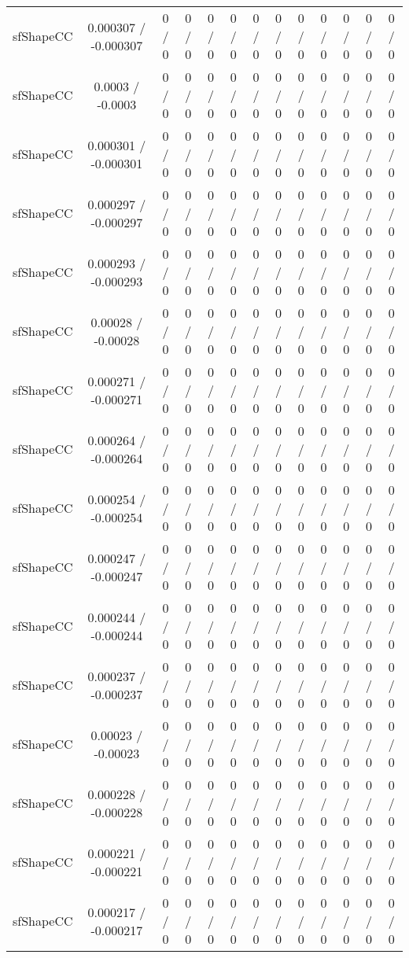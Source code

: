 \documentclass[10pt]{article}
\begin{document}
\begin{table}[htbp]
\begin{center}
\begin{tabular}{|c|c|c|c|c|c|c|c|c|c|c|c|c|}
  sfShapeCC & 0.000307 / -0.000307 & 0 / 0 & 0 / 0 & 0 / 0 & 0 / 0 & 0 / 0 & 0 / 0 & 0 / 0 & 0 / 0 & 0 / 0 & 0 / 0 & 0 / 0 \\ 
  sfShapeCC & 0.0003 / -0.0003 & 0 / 0 & 0 / 0 & 0 / 0 & 0 / 0 & 0 / 0 & 0 / 0 & 0 / 0 & 0 / 0 & 0 / 0 & 0 / 0 & 0 / 0 \\ 
  sfShapeCC & 0.000301 / -0.000301 & 0 / 0 & 0 / 0 & 0 / 0 & 0 / 0 & 0 / 0 & 0 / 0 & 0 / 0 & 0 / 0 & 0 / 0 & 0 / 0 & 0 / 0 \\ 
  sfShapeCC & 0.000297 / -0.000297 & 0 / 0 & 0 / 0 & 0 / 0 & 0 / 0 & 0 / 0 & 0 / 0 & 0 / 0 & 0 / 0 & 0 / 0 & 0 / 0 & 0 / 0 \\ 
  sfShapeCC & 0.000293 / -0.000293 & 0 / 0 & 0 / 0 & 0 / 0 & 0 / 0 & 0 / 0 & 0 / 0 & 0 / 0 & 0 / 0 & 0 / 0 & 0 / 0 & 0 / 0 \\ 
  sfShapeCC & 0.00028 / -0.00028 & 0 / 0 & 0 / 0 & 0 / 0 & 0 / 0 & 0 / 0 & 0 / 0 & 0 / 0 & 0 / 0 & 0 / 0 & 0 / 0 & 0 / 0 \\ 
  sfShapeCC & 0.000271 / -0.000271 & 0 / 0 & 0 / 0 & 0 / 0 & 0 / 0 & 0 / 0 & 0 / 0 & 0 / 0 & 0 / 0 & 0 / 0 & 0 / 0 & 0 / 0 \\ 
  sfShapeCC & 0.000264 / -0.000264 & 0 / 0 & 0 / 0 & 0 / 0 & 0 / 0 & 0 / 0 & 0 / 0 & 0 / 0 & 0 / 0 & 0 / 0 & 0 / 0 & 0 / 0 \\ 
  sfShapeCC & 0.000254 / -0.000254 & 0 / 0 & 0 / 0 & 0 / 0 & 0 / 0 & 0 / 0 & 0 / 0 & 0 / 0 & 0 / 0 & 0 / 0 & 0 / 0 & 0 / 0 \\ 
  sfShapeCC & 0.000247 / -0.000247 & 0 / 0 & 0 / 0 & 0 / 0 & 0 / 0 & 0 / 0 & 0 / 0 & 0 / 0 & 0 / 0 & 0 / 0 & 0 / 0 & 0 / 0 \\ 
  sfShapeCC & 0.000244 / -0.000244 & 0 / 0 & 0 / 0 & 0 / 0 & 0 / 0 & 0 / 0 & 0 / 0 & 0 / 0 & 0 / 0 & 0 / 0 & 0 / 0 & 0 / 0 \\ 
  sfShapeCC & 0.000237 / -0.000237 & 0 / 0 & 0 / 0 & 0 / 0 & 0 / 0 & 0 / 0 & 0 / 0 & 0 / 0 & 0 / 0 & 0 / 0 & 0 / 0 & 0 / 0 \\ 
  sfShapeCC & 0.00023 / -0.00023 & 0 / 0 & 0 / 0 & 0 / 0 & 0 / 0 & 0 / 0 & 0 / 0 & 0 / 0 & 0 / 0 & 0 / 0 & 0 / 0 & 0 / 0 \\ 
  sfShapeCC & 0.000228 / -0.000228 & 0 / 0 & 0 / 0 & 0 / 0 & 0 / 0 & 0 / 0 & 0 / 0 & 0 / 0 & 0 / 0 & 0 / 0 & 0 / 0 & 0 / 0 \\ 
  sfShapeCC & 0.000221 / -0.000221 & 0 / 0 & 0 / 0 & 0 / 0 & 0 / 0 & 0 / 0 & 0 / 0 & 0 / 0 & 0 / 0 & 0 / 0 & 0 / 0 & 0 / 0 \\ 
  sfShapeCC & 0.000217 / -0.000217 & 0 / 0 & 0 / 0 & 0 / 0 & 0 / 0 & 0 / 0 & 0 / 0 & 0 / 0 & 0 / 0 & 0 / 0 & 0 / 0 & 0 / 0 \\ 

\end{tabular}
\end{center}
\end{table}
\end{document}
